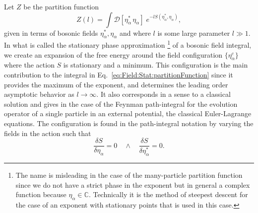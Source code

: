 Let $Z$ be the partition function
\begin{equation}
    \label{eq:Field:Stat:partitionFunction}
    Z(l) = \int\!\mathcal{D}[\eta^\ast_\alpha\,\eta_\alpha]\;e^{-lS(\eta^\ast_\alpha, \eta_\alpha)},
\end{equation}
given in terms of bosonic fields $\eta^\ast_\alpha, \eta_\alpha$ and where $l$ is some large parameter $l\gg 1$.
In what is called the stationary phase approximation%
%
\footnote{The name is misleading in the case of the many-particle partition function
since we do not have a strict phase in the exponent but in general a complex function because $\eta_\alpha\in\mathbb{C}$.
Technically it is the method of steepest descent for the case of an exponent with stationary points that is used in this
case.} %
%
of a bosonic field integral, we create an expansion of the free energy around
the field configuration $\{\eta^c_\alpha\}$ where the action $S$ is stationary and a minimum. This configuration
is the main contribution to the integral in Eq.~\eqref{eq:Field:Stat:partitionFunction} since it provides the maximum of
the exponent,
and determines the leading order asymptotic behavior as $l\to\infty$. It also corresponds in a sense to a classical solution
and gives in the case of the Feynman path-integral for the evolution operator of a single particle in an external potential,
the classical Euler-Lagrange equations.
The configuration is found in the path-integral notation by varying the fields in the action such that
\begin{equation}
    \label{eq:Field:Stat:stationaryCondition}
    \frac{\delta S}{\delta \eta_\alpha} = 0\quad\land\quad
    \frac{\delta S}{\delta \eta_\alpha^\ast} = 0.
\end{equation}


